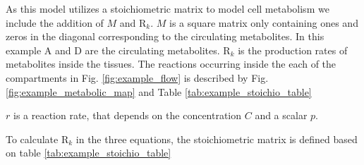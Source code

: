 \documentclass{IEEEtran}
\begin{document}
As this model utilizes a stoichiometric matrix to model cell metabolism \cite{yasemi_jolicoeur_2021} we include the addition of $M$ and R$_k$. $M$ is a square matrix only containing ones and zeros in the diagonal corresponding to the circulating metabolites. In this example A and D are the circulating metabolites. R$_k$ is the production rates of metabolites inside the tissues. 
The reactions occurring inside the each of the compartments in Fig. \ref{fig:example_flow} is described by Fig. \ref{fig:example_metabolic_map} and Table \ref{tab:example_stoichio_table} \\

\setlength\extrarowheight{-4pt}
\begin{table}[H]
\centering
 \caption{Summary of the stoichiometric reactions and its kinetics in the example model.}
 \label{tab:example_stoichio_table}
\end{table}

\setlength\extrarowheight{0pt}

$r$ is a reaction rate, that depends on the concentration $C$ and a scalar $p$.




To calculate R$_k$ in the three equations, the stoichiometric matrix is defined based on table \ref{tab:example_stoichio_table}  \\
\end{document}
